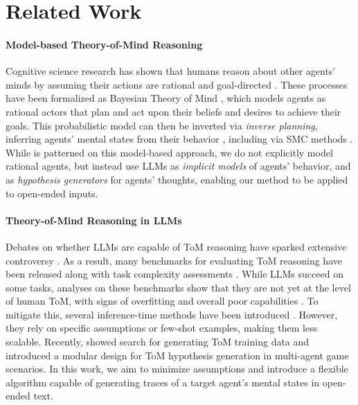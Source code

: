 \section{Related Work}
\paragraph{Model-based Theory-of-Mind Reasoning}
Cognitive science research has shown that humans reason about other agents' minds by assuming their actions are rational and goal-directed \citep{dennett1981intentional, csibra1999goal, baillargeon2016psychological}. These processes have been formalized as Bayesian Theory of Mind \citep{btom2017,jara2019naive}, which models agents as rational actors that plan and act upon their beliefs and desires to achieve their goals. This probabilistic model can then be inverted via \textit{inverse planning}, inferring agents' mental states from their behavior \citep{baker2009action,ying2023neuro,ying2024understanding}, including via SMC methods \citep{zhi2020online,zhixuan2024infinite}. While \tracing is patterned on this model-based approach, we do not explicitly model rational agents, but instead use LLMs as \emph{implicit models} of agents' behavior, and as \emph{hypothesis generators} for agents' thoughts, enabling our method to be applied to open-ended inputs.

\paragraph{Theory-of-Mind Reasoning in LLMs}
Debates on whether LLMs are capable of ToM reasoning have sparked extensive controversy \citep{ullman2023large, whang2023nytimes, ma-etal-2023-towards-holistic, shapira-etal-2024-clever}.
As a result, many benchmarks for evaluating ToM reasoning have been released \citep[inter alia]{le-etal-2019-revisiting, gandhi2023understanding, wu-etal-2023-hi, shapira-etal-2023-well, jin-etal-2024-mmtom, chen-etal-2024-tombench, xu-etal-2024-opentom} along with task complexity assessments \citep{huang2024notion}.
While LLMs succeed on some tasks, analyses on these benchmarks show that they are not yet at the level of human ToM, with signs of overfitting \citep{sclar-etal-2023-minding} and overall poor capabilities \citep{sap-etal-2022-neural, kim-etal-2023-fantom}.
To mitigate this, several inference-time methods have been introduced \citep{sclar-etal-2023-minding, wilf-etal-2024-think, jung-etal-2024-perceptions}.
However, they rely on specific assumptions or few-shot examples, making them less scalable.
Recently, \citet{sclar2025exploretom} showed search for generating ToM training data and \citet{cross2025hypothetical} introduced a modular design for ToM hypothesis generation in multi-agent game scenarios.
In this work, we aim to minimize assumptions and introduce a flexible algorithm capable of generating traces of a target agent's mental states in open-ended text.


